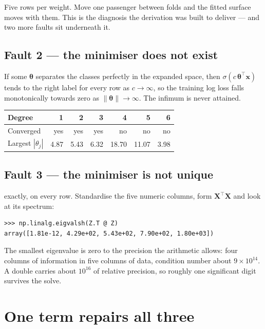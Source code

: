 \documentclass[11pt,a4paper]{article}
\begin{document}
Five rows per weight. Move one passenger between folds and the fitted surface
moves with them. This is the diagnosis the derivation was built to deliver ---
and two more faults sit underneath it.

\subsection{Fault 2 --- the minimiser does not exist}

If some $\boldsymbol\theta$ separates the classes perfectly in the expanded
space, then $\sigma(c\,\boldsymbol\theta^{\intercal}\mathbf{x})$ tends to the
right label for every row as $c \to \infty$, so the training log loss falls
monotonically towards zero as $\lVert\boldsymbol\theta\rVert \to \infty$. The
infimum is never attained.

\begin{center}
\small
\begin{tabular}{lrrrrrr}
\toprule
\textbf{Degree} & 1 & 2 & 3 & 4 & 5 & 6 \\
\midrule
Converged & yes & yes & yes & no & no & no \\
Largest $|\theta_j|$ & 4.87 & 5.43 & 6.32 & 18.70 & 11.07 & 3.98 \\
\bottomrule
\end{tabular}
\end{center}

\subsection{Fault 3 --- the minimiser is not unique}

 exactly, on every row. Standardise the
five numeric columns, form $\mathbf{X}^{\intercal}\mathbf{X}$ and look at its
spectrum:

\begin{center}
\small
\begin{verbatim}
>>> np.linalg.eigvalsh(Z.T @ Z)
array([1.81e-12, 4.29e+02, 5.43e+02, 7.90e+02, 1.80e+03])
\end{verbatim}
\end{center}

The smallest eigenvalue is zero to the precision the arithmetic allows: four
columns of information in five columns of data, condition number about
$9\times10^{14}$. A double carries about $10^{16}$ of relative precision, so
roughly one significant digit survives the solve.

\section{One term repairs all three}
\end{document}
